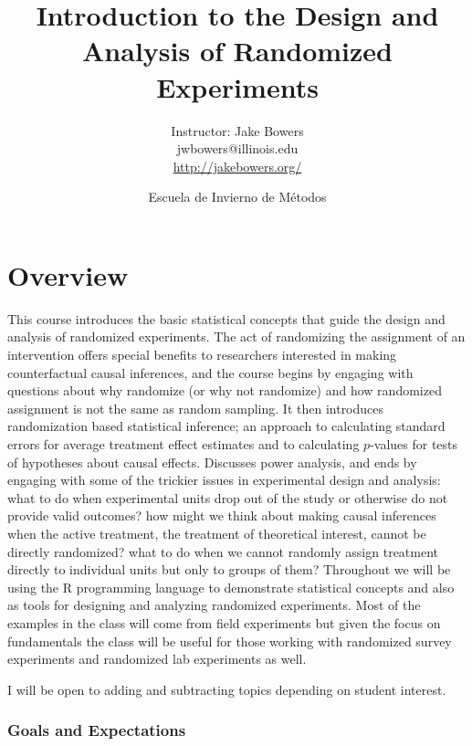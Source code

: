 \documentclass[10pt]{article}
\title{Introduction to the Design and Analysis of Randomized Experiments}
\author{Instructor: Jake Bowers \\
    jwbowers@illinois.edu \\
    \url{http://jakebowers.org/}
}
\date{Escuela de Invierno de Métodos \the\year}
\makeatletter
\newenvironment{introstuff} {\setcounter{secnumdepth}{0}} {\setcounter{secnumdepth}{1}}
\def\maketitle{%
    \thispagestyle{empty}%
    \begin{center}\leavevmode
        \normalfont
        {\large \bfseries\@title\par}%
        {\large \@author\par}%
        {\large \@date\par}%
    \end{center}%
\null }
\makeatother
\begin{document}
    \pagestyle{myfancy}

 \begin{introstuff}

        \maketitle

        \part*{Overview}

This course introduces the basic statistical concepts that guide the design and
analysis of randomized experiments. The act of randomizing the assignment of an
intervention offers special benefits to researchers interested in making
counterfactual causal inferences, and the course begins by engaging with
questions about why randomize (or why not randomize) and how randomized
assignment is not the same as random sampling. It then introduces randomization
based statistical inference; an approach to calculating standard errors for
average treatment effect estimates and to calculating $p$-values for tests of
hypotheses about causal effects. Discusses power analysis, and ends by engaging
with some of the trickier issues in experimental design and analysis: what to
do when experimental units drop out of the study or otherwise do not provide
valid outcomes? how might we think about making causal inferences when the
active treatment, the treatment of theoretical interest, cannot be directly
randomized? what to do when we cannot randomly assign treatment directly to
individual units but only to groups of them? Throughout we will be using the R
programming language to demonstrate statistical concepts and also as tools for
designing and analyzing randomized experiments. Most of the examples in the
class will come from field experiments but given the focus on fundamentals the
class will be useful for those working with randomized survey experiments and
randomized lab experiments as well.

I will be open to adding and subtracting topics depending on student interest.

\section{Goals and Expectations}


\end{introstuff}
\end{document}
